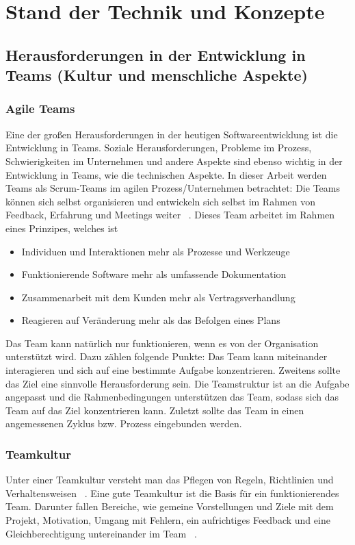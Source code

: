\chapter{Stand der Technik und Konzepte}
\chapterstart

\label{chap:related}
\section{Herausforderungen in der Entwicklung in Teams (Kultur und menschliche Aspekte)}
\subsection{Agile Teams}
Eine der großen Herausforderungen in der heutigen Softwareentwicklung ist die Entwicklung in Teams. Soziale Herausforderungen, Probleme im Prozess, Schwierigkeiten im Unternehmen und andere Aspekte sind ebenso wichtig in der Entwicklung in Teams, wie die technischen Aspekte. In dieser Arbeit werden Teams als Scrum-Teams im agilen Prozess/Unternehmen betrachtet: Die Teams können sich selbst organisieren und entwickeln sich selbst im Rahmen von Feedback, Erfahrung und Meetings weiter ~\parencite{cohn2003introducing}. Dieses Team arbeitet im Rahmen eines Prinzipes, welches ist ~\parencite{beck2001agile}
\begin{itemize} 
\item Individuen und Interaktionen mehr als Prozesse und Werkzeuge
\item Funktionierende Software mehr als umfassende Dokumentation
\item Zusammenarbeit mit dem Kunden mehr als Vertragsverhandlung
\item Reagieren auf Veränderung mehr als das Befolgen eines Plans
\end{itemize}
Das Team kann natürlich nur funktionieren, wenn es von der Organisation unterstützt wird. Dazu zählen folgende Punkte: Das Team kann miteinander interagieren und sich auf eine bestimmte Aufgabe konzentrieren. Zweitens sollte das Ziel eine sinnvolle Herausforderung sein. Die Teamstruktur ist an die Aufgabe angepasst und die Rahmenbedingungen unterstützen das Team, sodass sich das Team auf das Ziel konzentrieren kann. Zuletzt sollte das Team in einen angemessenen Zyklus bzw. Prozess eingebunden werden. ~\parencite{boos2017fuhrung}
\subsection{Teamkultur}
Unter einer Teamkultur versteht man das Pflegen von Regeln, Richtlinien und Verhaltensweisen ~\parencite{teamculture}. Eine gute Teamkultur ist die Basis für ein funktionierendes Team. Darunter fallen Bereiche, wie gemeine Vorstellungen und Ziele mit dem Projekt, Motivation, Umgang mit Fehlern, ein aufrichtiges Feedback und eine Gleichberechtigung untereinander im Team ~\parencite{teamcultureGrolman}. 
